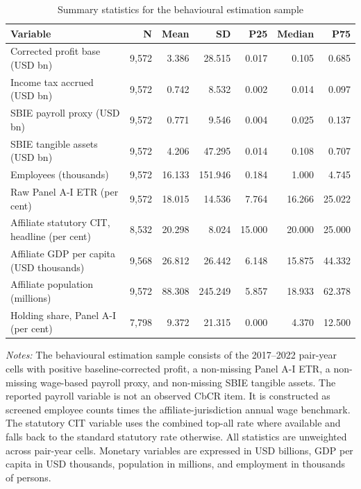\begin{table}[H]
\centering
\caption{Summary statistics for the behavioural estimation sample}
\label{tab:base_panel_summary_working}
\small
\begin{tabular}{@{}L{5.8cm}rrrrrr@{}}
\toprule
Variable & N & Mean & SD & P25 & Median & P75 \\
\midrule
Corrected profit base (USD bn) & 9,572 & 3.386 & 28.515 & 0.017 & 0.105 & 0.685 \\
Income tax accrued (USD bn) & 9,572 & 0.742 & 8.532 & 0.002 & 0.014 & 0.097 \\
SBIE payroll proxy (USD bn) & 9,572 & 0.771 & 9.546 & 0.004 & 0.025 & 0.137 \\
SBIE tangible assets (USD bn) & 9,572 & 4.206 & 47.295 & 0.014 & 0.108 & 0.707 \\
Employees (thousands) & 9,572 & 16.133 & 151.946 & 0.184 & 1.000 & 4.745 \\
Raw Panel A-I ETR (per cent) & 9,572 & 18.015 & 14.536 & 7.764 & 16.266 & 25.022 \\
Affiliate statutory CIT, headline (per cent) & 8,532 & 20.298 & 8.024 & 15.000 & 20.000 & 25.000 \\
Affiliate GDP per capita (USD thousands) & 9,568 & 26.812 & 26.442 & 6.148 & 15.875 & 44.332 \\
Affiliate population (millions) & 9,572 & 88.308 & 245.249 & 5.857 & 18.933 & 62.378 \\
Holding share, Panel A-I (per cent) & 7,798 & 9.372 & 21.315 & 0.000 & 4.370 & 12.500 \\
\bottomrule
\end{tabular}

\vspace{0.5em}
\begin{minipage}{0.93\textwidth}
\footnotesize \textit{Notes:} The behavioural estimation sample consists of the 2017--2022 pair-year cells with positive baseline-corrected profit, a non-missing Panel A-I ETR, a non-missing wage-based payroll proxy, and non-missing SBIE tangible assets. The reported payroll variable is not an observed CbCR item. It is constructed as screened employee counts times the affiliate-jurisdiction annual wage benchmark. The statutory CIT variable uses the combined top-all rate where available and falls back to the standard statutory rate otherwise. All statistics are unweighted across pair-year cells. Monetary variables are expressed in USD billions, GDP per capita in USD thousands, population in millions, and employment in thousands of persons.
\end{minipage}
\end{table}

